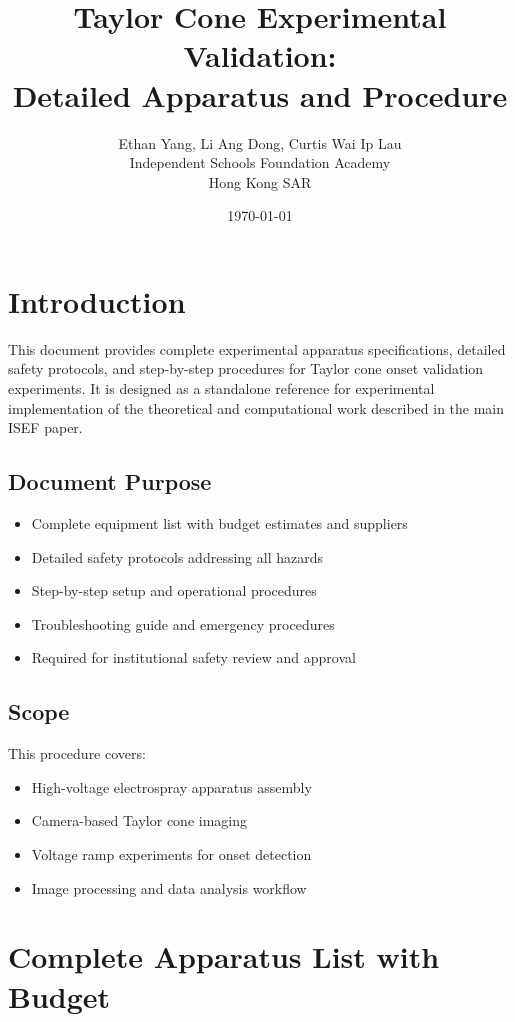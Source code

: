 \documentclass[11pt]{article}
\title{\textbf{Taylor Cone Experimental Validation:\\Detailed Apparatus and Procedure}}
\author{Ethan Yang, Li Ang Dong, Curtis Wai Ip Lau\\
Independent Schools Foundation Academy\\
Hong Kong SAR}
\date{\today}
\begin{document}
\maketitle

\tableofcontents
\newpage

\section{Introduction}

This document provides complete experimental apparatus specifications, detailed safety protocols, and step-by-step procedures for Taylor cone onset validation experiments. It is designed as a standalone reference for experimental implementation of the theoretical and computational work described in the main ISEF paper.

\subsection{Document Purpose}

\begin{itemize}
\item Complete equipment list with budget estimates and suppliers
\item Detailed safety protocols addressing all hazards
\item Step-by-step setup and operational procedures
\item Troubleshooting guide and emergency procedures
\item Required for institutional safety review and approval
\end{itemize}

\subsection{Scope}

This procedure covers:
\begin{itemize}
\item High-voltage electrospray apparatus assembly
\item Camera-based Taylor cone imaging
\item Voltage ramp experiments for onset detection
\item Image processing and data analysis workflow
\end{itemize}

\section{Complete Apparatus List with Budget}
\end{document}
